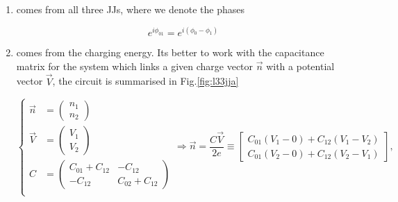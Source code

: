   \begin{enumerate}
  \item \textbf{} comes from all three JJs, where we denote the phases
  
  \begin{equation}
    e^{i\phi_{01}} = e^{i(\phi_0-\phi_1)}
  \end{equation}
  
    
  \begin{center}
        
    \label{fig:l33jjc}
  \end{center}
  
\item {} comes  from the charging  energy. Its better  to work
  with the  capacitance matrix for the  system which links a  given charge vector $  \vec{n} $
  with a potential vector $ \vec{V} $, the circuit is summarised in Fig.\ref{fig:l33jja}
  
  \begin{equation}
    \left\lbrace \begin{aligned}
        \vec{n} & = \left(\begin{smallmatrix}
            n_1\\n_2
          \end{smallmatrix}\right)\\
        \vec{V} & =\left(\begin{smallmatrix} V_1\\V_2
          \end{smallmatrix}\right)\\
        C & = \left(\begin{smallmatrix} C_{01}+C_{12} & -C_{12}\\-C_{12} &C_{02}+C_{12}
          \end{smallmatrix}\right)\\
      \end{aligned}\right. \Rightarrow \vec{n} = \frac{C\vec{V}}{2e} \equiv \begin{bmatrix}
      C_{01}\left(V_1-0\right)   +  C_{12}\left(V_1-V_2\right)\\   C_{01}\left(V_2-0\right)  +
      C_{12}\left(V_2-V_1\right)
    \end{bmatrix},
  \end{equation}
  

\end{enumerate}
